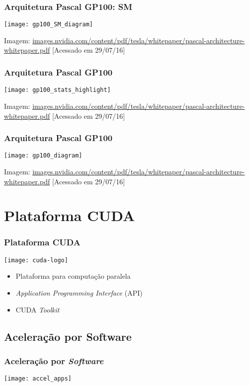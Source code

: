 \documentclass[10pt, compress, aspectratio=43, xcolor={table,usenames,dvipsnames}]{beamer}
\begin{document}
\begin{frame}
    \frametitle{Arquitetura Pascal GP100: SM}
    \centering
    \texttt{[image: gp100\_SM\_diagram]}
    \vfill

    \tiny{Imagem: \url{images.nvidia.com/content/pdf/tesla/whitepaper/pascal-architecture-whitepaper.pdf} [Acessado em 29/07/16]}
\end{frame}

\begin{frame}
    \frametitle{Arquitetura Pascal GP100}
    \centering
    \texttt{[image: gp100\_stats\_highlight]}
    \vfill

    \tiny{Imagem: \url{images.nvidia.com/content/pdf/tesla/whitepaper/pascal-architecture-whitepaper.pdf} [Acessado em 29/07/16]}
\end{frame}

\begin{frame}
    \frametitle{Arquitetura Pascal GP100}
    \centering
    \texttt{[image: gp100\_diagram]}
    \vfill

    \tiny{Imagem: \url{images.nvidia.com/content/pdf/tesla/whitepaper/pascal-architecture-whitepaper.pdf} [Acessado em 29/07/16]}
\end{frame}

\section{Plataforma CUDA}

\begin{frame}
    \frametitle{Plataforma CUDA}
    \begin{center}
        \texttt{[image: cuda-logo]}
    \end{center}

    \begin{itemize}
        \item Plataforma para \alert{computação paralela}
        \item \textit{Application Programming Interface} (API)
        \item CUDA \textit{Toolkit}
    \end{itemize}
\end{frame}

\subsection{Aceleração por Software}

\begin{frame}
    \frametitle{Aceleração por \textit{Software}}
    \centering
    \texttt{[image: accel\_apps]}
\end{frame}
\end{document}
